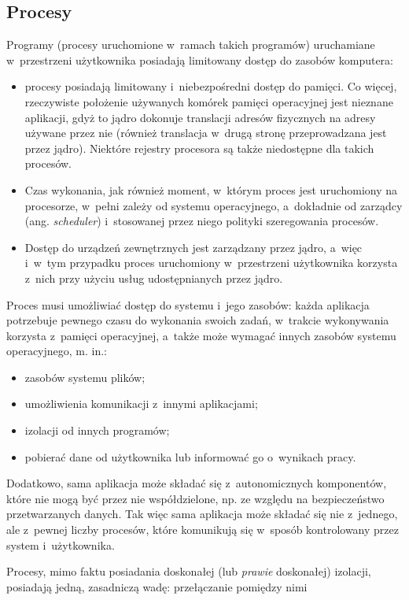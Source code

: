 \documentclass[12pt]{mwart}
\begin{document}
\subsection{Procesy}
\indent
	Programy (procesy uruchomione w~ramach takich programów) uruchamiane w~przestrzeni użytkownika posiadają limitowany dostęp do zasobów komputera:
	\begin{itemize}
		\item procesy posiadają limitowany i~niebezpośredni dostęp do pamięci. Co więcej, rzeczywiste położenie używanych komórek pamięci operacyjnej
			jest nieznane	aplikacji, gdyż to jądro dokonuje translacji adresów fizycznych na adresy używane przez nie (również translacja w~drugą stronę
			przeprowadzana jest przez jądro). Niektóre rejestry procesora są także niedostępne dla takich procesów.
		\item Czas wykonania, jak również moment, w~którym proces jest uruchomiony na procesorze, w~pełni zależy od systemu operacyjnego, a~dokładnie
			od zarządcy (ang. \emph{scheduler}) i~stosowanej przez niego polityki szeregowania procesów.
		\item Dostęp do urządzeń zewnętrznych jest zarządzany przez jądro, a~więc i~w~tym przypadku proces uruchomiony w~przestrzeni użytkownika
			korzysta z~nich przy użyciu usług udostępnianych przez jądro.
	\end{itemize}
\par
%
\indent
	Proces musi umożliwiać dostęp do systemu i~jego zasobów: każda aplikacja potrzebuje pewnego czasu do wykonania swoich zadań, w~trakcie wykonywania
	korzysta z~pamięci operacyjnej, a~także może wymagać innych zasobów systemu operacyjnego, m. in.:
	\begin{itemize}
		\item zasobów systemu plików;
		\item umożliwienia komunikacji z~innymi aplikacjami;
		\item izolacji od innych programów;
		\item pobierać dane od użytkownika lub informować go o~wynikach pracy.
	\end{itemize}
	Dodatkowo, sama aplikacja może składać się z~autonomicznych komponentów, które nie mogą być przez nie współdzielone, 
	np. ze względu na bezpieczeństwo przetwarzanych danych. Tak więc sama aplikacja może składać się nie z~jednego, ale z~pewnej liczby
	procesów, które komunikują się w~sposób kontrolowany przez system i~użytkownika.
\par
%
\indent
	Procesy, mimo faktu posiadania doskonałej (lub \emph{prawie} doskonałej) izolacji, posiadają jedną, zasadniczą wadę: przełączanie pomiędzy nimi
\end{document}

